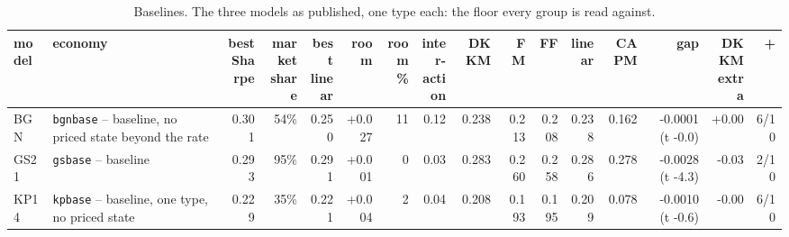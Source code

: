 \begin{table}[htbp]\centering\footnotesize\setlength{\tabcolsep}{2pt}
\caption{Baselines. The three models as published, one type each: the floor every group is read against.}\label{tab:g0}
\begin{adjustbox}{max width=\textwidth}\begin{tabular}{l>{\raggedright\arraybackslash}p{3.6cm}rrrrrrrrrrrrrr}\hline
model & economy & \shortstack[r]{best\\Sharpe} & \shortstack[r]{market\\share} & \shortstack[r]{best\\linear} & room & \shortstack[r]{room\\\%} & \shortstack[r]{inter-\\action} & DKKM & FM & FF & linear & CAPM & gap & \shortstack[r]{DKKM\\extra} & + \\\hline
BGN & \texttt{bgnbase} -- baseline, no priced state beyond the rate & 0.301 & 54\% & 0.250 & +0.027 & 11 & 0.12 & 0.238 & 0.213 & 0.208 & 0.238 & 0.162 & -0.0001 (t -0.0) & +0.00 & 6/10 \\
GS21 & \texttt{gsbase} -- baseline & 0.293 & 95\% & 0.291 & +0.001 & 0 & 0.03 & 0.283 & 0.260 & 0.258 & 0.286 & 0.278 & -0.0028 (t -4.3) & -0.03 & 2/10 \\
KP14 & \texttt{kpbase} -- baseline, one type, no priced state & 0.229 & 35\% & 0.221 & +0.004 & 2 & 0.04 & 0.208 & 0.193 & 0.195 & 0.209 & 0.078 & -0.0010 (t -0.6) & -0.00 & 6/10 \\
\hline\end{tabular}\end{adjustbox}\end{table}
